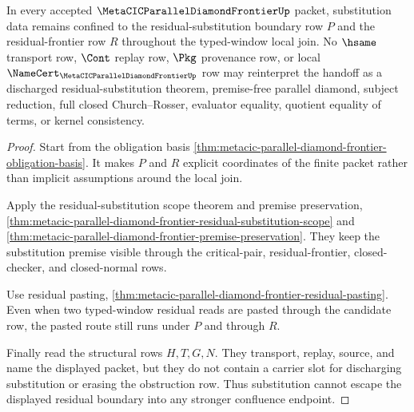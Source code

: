 \begin{theorem}
\label{thm:metacic-parallel-diamond-frontier-substitution-nonescape}
In every accepted $\MetaCICParallelDiamondFrontierUp$ packet, substitution data remains confined to the residual-substitution boundary row $P$ and the residual-frontier row $R$ throughout the typed-window local join. No $\hsame$ transport row, $\Cont$ replay row, $\Pkg$ provenance row, or local $\NameCert_{\MetaCICParallelDiamondFrontierUp}$ row may reinterpret the handoff as a discharged residual-substitution theorem, premise-free parallel diamond, subject reduction, full closed Church--Rosser, evaluator equality, quotient equality of terms, or kernel consistency.
\end{theorem}
\begin{proof}
Start from the obligation basis \autoref{thm:metacic-parallel-diamond-frontier-obligation-basis}. It makes $P$ and $R$ explicit coordinates of the finite packet rather than implicit assumptions around the local join.

Apply the residual-substitution scope theorem and premise preservation, \autoref{thm:metacic-parallel-diamond-frontier-residual-substitution-scope} and \autoref{thm:metacic-parallel-diamond-frontier-premise-preservation}. They keep the substitution premise visible through the critical-pair, residual-frontier, closed-checker, and closed-normal rows.

Use residual pasting, \autoref{thm:metacic-parallel-diamond-frontier-residual-pasting}. Even when two typed-window residual reads are pasted through the candidate row, the pasted route still runs under $P$ and through $R$.

Finally read the structural rows $H,T,G,N$. They transport, replay, source, and name the displayed packet, but they do not contain a carrier slot for discharging substitution or erasing the obstruction row. Thus substitution cannot escape the displayed residual boundary into any stronger confluence endpoint.
\end{proof}


